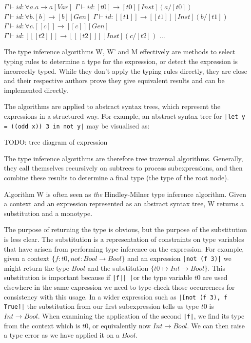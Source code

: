 \documentclass[a4paper,fleqn,12pt]{article}
\begin{document}
$\Gamma \vdash id : \forall a. a \rightarrow a [Var]$
$\Gamma \vdash id : [t0] \rightarrow [t0] [Inst] (a/[t0])$
$\Gamma \vdash id : \forall b. [b] \rightarrow [b] [Gen]$
$\Gamma \vdash id : [[t1]] \rightarrow [[t1]] [Inst] (b/[t1])$
$\Gamma \vdash id : \forall c. [[c]] \rightarrow [[c]] [Gen]$
$\Gamma \vdash id : [[[t2]]] \rightarrow [[[t2]]] [Inst] (c/[t2])$
$\dots$

The type inference algorithms W, W’ and M effectively are methods to select typing rules to determine a type for the expression, or detect the expression is incorrectly typed. While they don’t apply the typing rules directly, they are close and their respective authors prove they give equivalent results and can be implemented directly.

The algorithms are applied to abstract syntax trees, which represent the expressions in a structured way. For example, an abstract syntax tree for \texttt{|let y = (\x \rightarrow (odd x)) 3 in not y|} may be visualised as:

TODO: tree diagram of expression

The type inference algorithms are therefore tree traversal algorithms. Generally, they call themselves recursively on subtrees to process subexpressions, and then combine these results to determine a final type (the type of the root node).

Algorithm W is often seen as \textit{the} Hindley-Milner type inference algorithm. Given a context and an expression represented as an abstract syntax tree, W returns a substitution and a monotype.

The purpose of returning the type is obvious, but the purpose of the substitution is less clear. The substitution is a representation of constraints on type variables that have arisen from performing type inference on the expression. For example, given a context $\{ f: t0, not: Bool \rightarrow Bool \}$ and an expression \texttt{|not (f 3)|} we might return the type $Bool$ and the substitution $\{ t0 \mapsto Int \rightarrow Bool \}$. This substitution is important because if \texttt{|f|}\texttt{| |}or the type variable $t0$ are used elsewhere in the same expression we need to type-check those occurrences for consistency with this usage. In a wider expression such as \texttt{|[not (f 3), f True]|} the substitution from our first subexpression tells us type $t0$ is $Int \rightarrow Bool$. When examining the application of the second \texttt{|f|}, we find its type from the context which is $t0$, or equivalently now $Int \rightarrow Bool$. We can then raise a type error as we have applied it on a $Bool$.
\end{document}
